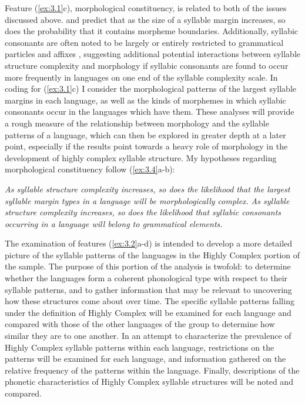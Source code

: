   Feature (\ref{ex:3.1}c), morphological constituency, is related to both of the issues discussed above. \citet[250]{Greenberg19651978} and \citet{DresslerDziubalska-Kołaczyk2006} predict that as the size of a syllable margin increases, so does the probability that it contains morpheme boundaries. Additionally, syllabic consonants are often noted to be largely or entirely restricted to grammatical particles and affixes \citep[159]{Bell1978a}, suggesting additional potential interactions between syllable structure complexity and morphology if syllabic consonants are found to occur more frequently in languages on one end of the syllable complexity scale. In coding for (\ref{ex:3.1}c) I consider the morphological patterns of the largest syllable margins in each language, as well as the kinds of morphemes in which syllabic consonants occur in the languages which have them. These analyses will provide a rough measure of the relationship between morphology and the syllable patterns of a language, which can then be explored in greater depth at a later point, especially if the results point towards a heavy role of morphology in the development of highly complex syllable structure. My hypotheses regarding morphological constituency follow (\ref{ex:3.4}a-b):

\ea\label{ex:3.4}
\ea  \textit{As syllable structure complexity increases, so does the likelihood that the largest syllable margin types in a language will be morphologically complex.} 
\ex  \textit{As syllable structure complexity increases, so does the likelihood that syllabic consonants occurring in a language will belong to grammatical elements.}
\z
\z

  The examination of features (\ref{ex:3.2}a-d) is intended to develop a more detailed picture of the syllable patterns of the languages in the Highly Complex portion of the sample. The purpose of this portion of the analysis is twofold: to determine whether the languages form a coherent phonological type with respect to their syllable patterns, and to gather information that may be relevant to uncovering how these structures come about over time. The specific syllable patterns falling under the definition of Highly Complex will be examined for each language and compared with those of the other languages of the group to determine how similar they are to one another. In an attempt to characterize the prevalence of Highly Complex syllable patterns within each language, restrictions on the patterns will be examined for each language, and information gathered on the relative frequency of the patterns within the language. Finally, descriptions of the phonetic characteristics of Highly Complex syllable structures will be noted and compared.

